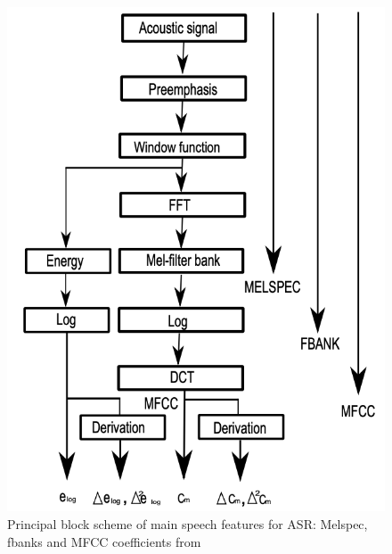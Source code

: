\begin{figure}
    \begin{center}
    \includegraphics[scale=0.3]{imgs/features.png}
    \caption{Principal block scheme of main speech features for ASR: Melspec, fbanks and MFCC coefficients from \cite{kiktova2013comparison}}
    \label{feature_block}    
    \end{center}
\end{figure}

